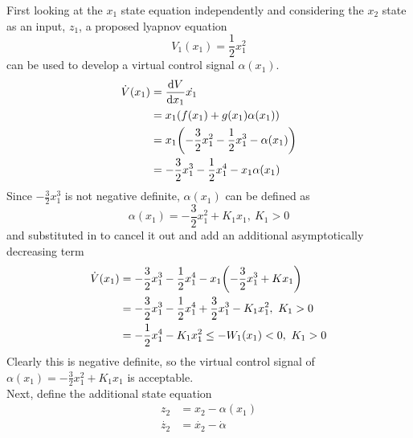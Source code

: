 \documentclass[letter]{article}
\begin{document}
First looking at the $x_1$ state equation independently and considering the $x_2$ state as an input, $z_1$, a proposed lyapnov equation $$V_1(x_1) = \frac{1}{2} x_1^2$$ can be used to develop a virtual control signal $\alpha(x_1)$.
\begin{align}
	\dot{V}(x_1)
	&= \dv{V}{x_1} \dot{x_1}\\
	&= x_1 \qty(f(x_1) + g(x_1) \alpha(x_1))\\
	&= x_1 \qty(-\frac{3}{2} x_1^2 - \frac{1}{2} x_1^3 - \alpha(x_1))\\
	&= -\frac{3}{2} x_1^3 - \frac{1}{2} x_1^4 - x_1 \alpha(x_1)
\end{align}
Since $-\frac{3}{2} x_1^3$ is not negative definite, $\alpha(x_1)$ can be defined as $$\alpha(x_1) = -\frac{3}{2} x_1^2 + K_1 x_1, \ K_1 > 0$$ and substituted in to cancel it out and add an additional asymptotically decreasing term
\begin{align}
	\dot{V}(x_1)
	&= -\frac{3}{2} x_1^3 - \frac{1}{2} x_1^4 - x_1 \qty(-\frac{3}{2} x_1^3 + K x_1)\\
	&= -\frac{3}{2} x_1^3 - \frac{1}{2} x_1^4  + \frac{3}{2} x_1^3 - K_1 x_1^2, \ K_1 >0\\
	&= -\frac{1}{2} x_1^4 - K_1 x_1^2 \leq -W_1(x_1) < 0, \ K_1 > 0
\end{align}
Clearly this is negative definite, so the virtual control signal of $\alpha(x_1) = -\frac{3}{2} x_1^2 + K_1 x_1$ is acceptable.\\

Next, define the additional state equation
\begin{align}
	z_2
	&= x_2 - \alpha(x_1)\\
	\dot{z_2}
	&= \dot{x_2} - \dot{\alpha}\\
\end{align}
\end{document}
